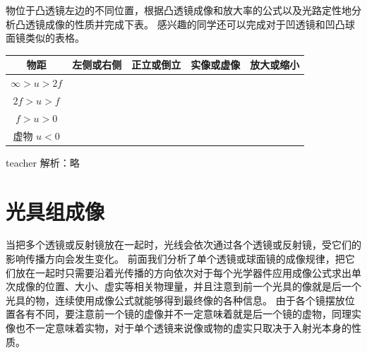\begin{example}
物位于凸透镜左边的不同位置，根据凸透镜成像和放大率的公式以及光路定性地分析凸透镜成像的性质并完成下表。
感兴趣的同学还可以完成对于凹透镜和凹凸球面镜类似的表格。

\begin{tabular}{|c|c|c|c|c|}
\hline 
物距 & 左侧或右侧 & 正立或倒立 & 实像或虚像 & 放大或缩小 \\ 
\hline 
$\infty>u>2f$ &  &  &  &  \\ 
\hline 
$2f>u>f$ &  &  &  &  \\ 
\hline 
$f>u>0$ &  &  &  &  \\ 
\hline 
虚物 $u<0$ &  &  & &  \\ 
\hline 
\end{tabular} 
\begin{taggedblock}{teacher}
\newline
解析：略
\end{taggedblock}
\end{example}







\section{光具组成像}
当把多个透镜或反射镜放在一起时，光线会依次通过各个透镜或反射镜，受它们的影响传播方向会发生变化。
前面我们分析了单个透镜或球面镜的成像规律，把它们放在一起时只需要沿着光传播的方向依次对于每个光学器件应用成像公式求出单次成像的位置、大小、虚实等相关物理量，并且注意到前一个光具的像就是后一个光具的物，连续使用成像公式就能够得到最终像的各种信息。
由于各个镜摆放位置各有不同，要注意前一个镜的虚像并不一定意味着就是后一个镜的虚物，同理实像也不一定意味着实物，对于单个透镜来说像或物的虚实只取决于入射光本身的性质。


